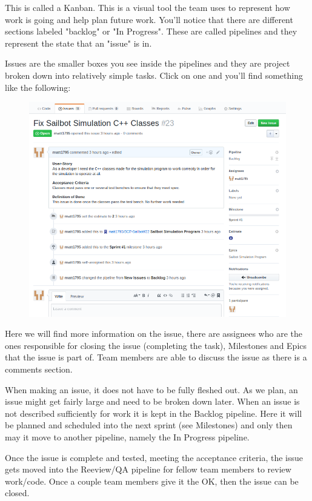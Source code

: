 \documentclass{article}
\begin{document}
This is called a Kanban. This is a visual tool the team uses to represent how
work is going and help plan future work. You'll notice that there are
different sections labeled "backlog" or "In Progress". These are called
pipelines and they represent the state that an "issue" is in. 

\newpage

Issues are the smaller boxes you see inside the pipelines and they are project
broken down into relatively simple tasks. Click on one and you'll find something
like the following:

\begin{figure}[H]
    \centering
    \includegraphics[scale=0.5]{issue.png}
\end{figure}

Here we will find more information on the issue, there are assignees who are the
ones responsible for closing the issue (completing the task), Milestones and
Epics that the issue is part of. Team members are able to discuss the issue as
there is a comments section.

When making an issue, it does not have to be fully fleshed out. As we plan, an
issue might get fairly large and need to be broken down later. When an issue is
not described sufficiently for work it is kept in the Backlog pipeline. Here it
will be planned and scheduled into the next sprint (see Milestones) and only
then may it move to another pipeline, namely the In Progress pipeline.

Once the issue is complete and tested, meeting the acceptance criteria, the
issue gets moved into the Reeview/QA pipeline for fellow team members to review
work/code. Once a couple team members give it the OK, then the issue can be
closed.
\end{document}
